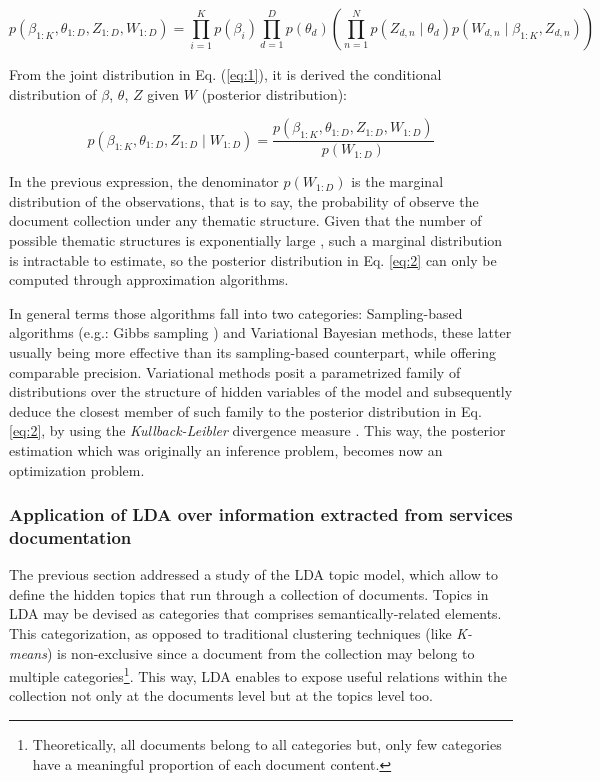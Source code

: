 \begin{equation}
p(\beta_{1:K},\theta_{1:D},Z_{1:D},W_{1:D})=\prod_{i=1}^{K}p(\beta_{i})\prod_{d=1}^{D}p(\theta_{d})(\prod_{n=1}^{N}p(Z_{d,n}\mid\theta_{d})p(W_{d,n}\mid\beta_{1:K},Z_{d,n}))\label{eq:1}
\end{equation}

From the joint distribution in Eq. (\ref{eq:1}), it is derived the conditional distribution of $\beta$, $\theta$, $Z$ given $W$ (posterior distribution):

\begin{equation}
p(\beta_{1:K},\theta_{1:D},Z_{1:D}\mid W_{1:D})=\frac{p(\beta_{1:K},\theta_{1:D},Z_{1:D},W_{1:D})}{p(W_{1:D})}\label{eq:2}
\end{equation}

In the previous expression, the denominator $p(W_{1:D})$ is the marginal distribution of the observations, that is to say, the probability of observe the document collection under any thematic structure. Given that the number of possible thematic structures is exponentially large \cite{Blei:2003}, such a marginal distribution is intractable to estimate, so the posterior distribution in Eq. \ref{eq:2} can only be computed through approximation algorithms.

In general terms those algorithms fall into two categories: Sampling-based algorithms (e.g.: Gibbs sampling \cite{Geman:1984}) and Variational Bayesian methods, these latter usually being more effective than its sampling-based counterpart, while offering comparable precision. Variational methods posit a parametrized family of distributions over the structure of hidden variables of the model and subsequently deduce the closest member of such family to the posterior distribution in Eq. \ref{eq:2}, by using the \emph{Kullback-Leibler} divergence measure \cite{Shlens:2007}.
This way, the posterior estimation which was originally an inference problem, becomes now an optimization problem. 


\subsubsection{Application of LDA over information extracted from services documentation}
\label{subsub:Application-of-LDA}

The previous section addressed a study of the LDA topic model, which allow to define the hidden topics that run through a collection of documents. Topics in LDA may be devised as categories  that comprises semantically-related elements. This categorization, as opposed to traditional clustering techniques (like \emph{K-means}) is non-exclusive since a document from the collection may belong to multiple categories\footnote{Theoretically, all documents belong to all categories but, only few categories have a meaningful proportion of each document content.}. This way, LDA enables to expose useful relations within the collection not only at the documents level but at the topics level too. 

